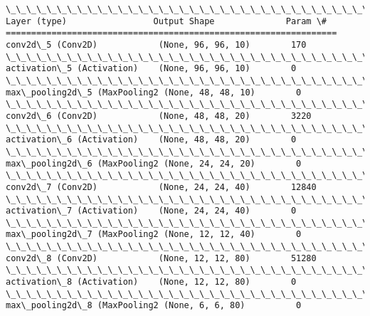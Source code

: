\documentclass[11pt]{article}
\begin{document}
    \begin{Verbatim}[commandchars=\\\{\}]
\_\_\_\_\_\_\_\_\_\_\_\_\_\_\_\_\_\_\_\_\_\_\_\_\_\_\_\_\_\_\_\_\_\_\_\_\_\_\_\_\_\_\_\_\_\_\_\_\_\_\_\_\_\_\_\_\_\_\_\_\_\_\_\_\_
Layer (type)                 Output Shape              Param \#   
=================================================================
conv2d\_5 (Conv2D)            (None, 96, 96, 10)        170       
\_\_\_\_\_\_\_\_\_\_\_\_\_\_\_\_\_\_\_\_\_\_\_\_\_\_\_\_\_\_\_\_\_\_\_\_\_\_\_\_\_\_\_\_\_\_\_\_\_\_\_\_\_\_\_\_\_\_\_\_\_\_\_\_\_
activation\_5 (Activation)    (None, 96, 96, 10)        0         
\_\_\_\_\_\_\_\_\_\_\_\_\_\_\_\_\_\_\_\_\_\_\_\_\_\_\_\_\_\_\_\_\_\_\_\_\_\_\_\_\_\_\_\_\_\_\_\_\_\_\_\_\_\_\_\_\_\_\_\_\_\_\_\_\_
max\_pooling2d\_5 (MaxPooling2 (None, 48, 48, 10)        0         
\_\_\_\_\_\_\_\_\_\_\_\_\_\_\_\_\_\_\_\_\_\_\_\_\_\_\_\_\_\_\_\_\_\_\_\_\_\_\_\_\_\_\_\_\_\_\_\_\_\_\_\_\_\_\_\_\_\_\_\_\_\_\_\_\_
conv2d\_6 (Conv2D)            (None, 48, 48, 20)        3220      
\_\_\_\_\_\_\_\_\_\_\_\_\_\_\_\_\_\_\_\_\_\_\_\_\_\_\_\_\_\_\_\_\_\_\_\_\_\_\_\_\_\_\_\_\_\_\_\_\_\_\_\_\_\_\_\_\_\_\_\_\_\_\_\_\_
activation\_6 (Activation)    (None, 48, 48, 20)        0         
\_\_\_\_\_\_\_\_\_\_\_\_\_\_\_\_\_\_\_\_\_\_\_\_\_\_\_\_\_\_\_\_\_\_\_\_\_\_\_\_\_\_\_\_\_\_\_\_\_\_\_\_\_\_\_\_\_\_\_\_\_\_\_\_\_
max\_pooling2d\_6 (MaxPooling2 (None, 24, 24, 20)        0         
\_\_\_\_\_\_\_\_\_\_\_\_\_\_\_\_\_\_\_\_\_\_\_\_\_\_\_\_\_\_\_\_\_\_\_\_\_\_\_\_\_\_\_\_\_\_\_\_\_\_\_\_\_\_\_\_\_\_\_\_\_\_\_\_\_
conv2d\_7 (Conv2D)            (None, 24, 24, 40)        12840     
\_\_\_\_\_\_\_\_\_\_\_\_\_\_\_\_\_\_\_\_\_\_\_\_\_\_\_\_\_\_\_\_\_\_\_\_\_\_\_\_\_\_\_\_\_\_\_\_\_\_\_\_\_\_\_\_\_\_\_\_\_\_\_\_\_
activation\_7 (Activation)    (None, 24, 24, 40)        0         
\_\_\_\_\_\_\_\_\_\_\_\_\_\_\_\_\_\_\_\_\_\_\_\_\_\_\_\_\_\_\_\_\_\_\_\_\_\_\_\_\_\_\_\_\_\_\_\_\_\_\_\_\_\_\_\_\_\_\_\_\_\_\_\_\_
max\_pooling2d\_7 (MaxPooling2 (None, 12, 12, 40)        0         
\_\_\_\_\_\_\_\_\_\_\_\_\_\_\_\_\_\_\_\_\_\_\_\_\_\_\_\_\_\_\_\_\_\_\_\_\_\_\_\_\_\_\_\_\_\_\_\_\_\_\_\_\_\_\_\_\_\_\_\_\_\_\_\_\_
conv2d\_8 (Conv2D)            (None, 12, 12, 80)        51280     
\_\_\_\_\_\_\_\_\_\_\_\_\_\_\_\_\_\_\_\_\_\_\_\_\_\_\_\_\_\_\_\_\_\_\_\_\_\_\_\_\_\_\_\_\_\_\_\_\_\_\_\_\_\_\_\_\_\_\_\_\_\_\_\_\_
activation\_8 (Activation)    (None, 12, 12, 80)        0         
\_\_\_\_\_\_\_\_\_\_\_\_\_\_\_\_\_\_\_\_\_\_\_\_\_\_\_\_\_\_\_\_\_\_\_\_\_\_\_\_\_\_\_\_\_\_\_\_\_\_\_\_\_\_\_\_\_\_\_\_\_\_\_\_\_
max\_pooling2d\_8 (MaxPooling2 (None, 6, 6, 80)          0         

\end{Verbatim}
\end{document}
